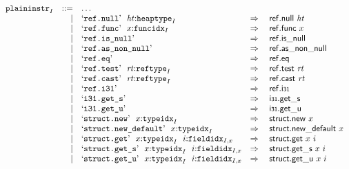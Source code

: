 $$
\begin{array}[t]{@{}lrrl@{}l@{}l@{}l@{}}
& {{\mathtt{plaininstr}}}_{I} & ::= & \dots \\
& & | & \mbox{‘\texttt{ref.null}’}~~{\mathit{ht}}{:}{{\mathtt{heaptype}}}_{I} & \quad\Rightarrow\quad{} & \mathsf{ref{.}null}~{\mathit{ht}} \\
& & | & \mbox{‘\texttt{ref.func}’}~~x{:}{{\mathtt{funcidx}}}_{I} & \quad\Rightarrow\quad{} & \mathsf{ref{.}func}~x \\
& & | & \mbox{‘\texttt{ref.is\_null}’} & \quad\Rightarrow\quad{} & \mathsf{ref{.}is\_null} \\
& & | & \mbox{‘\texttt{ref.as\_non\_null}’} & \quad\Rightarrow\quad{} & \mathsf{ref{.}as\_non\_null} \\
& & | & \mbox{‘\texttt{ref.eq}’} & \quad\Rightarrow\quad{} & \mathsf{ref{.}eq} \\
& & | & \mbox{‘\texttt{ref.test}’}~~{\mathit{rt}}{:}{{\mathtt{reftype}}}_{I} & \quad\Rightarrow\quad{} & \mathsf{ref{.}test}~{\mathit{rt}} \\
& & | & \mbox{‘\texttt{ref.cast}’}~~{\mathit{rt}}{:}{{\mathtt{reftype}}}_{I} & \quad\Rightarrow\quad{} & \mathsf{ref{.}cast}~{\mathit{rt}} \\
& & | & \mbox{‘\texttt{ref.i31}’} & \quad\Rightarrow\quad{} & \mathsf{ref{.}i{\scriptstyle 31}} \\
& & | & \mbox{‘\texttt{i31.get\_s}’} & \quad\Rightarrow\quad{} & {\mathsf{i{\scriptstyle 31}{.}get}}{\mathsf{\_}}{\mathsf{s}} \\
& & | & \mbox{‘\texttt{i31.get\_u}’} & \quad\Rightarrow\quad{} & {\mathsf{i{\scriptstyle 31}{.}get}}{\mathsf{\_}}{\mathsf{u}} \\
& & | & \mbox{‘\texttt{struct.new}’}~~x{:}{{\mathtt{typeidx}}}_{I} & \quad\Rightarrow\quad{} & \mathsf{struct{.}new}~x \\
& & | & \mbox{‘\texttt{struct.new\_default}’}~~x{:}{{\mathtt{typeidx}}}_{I} & \quad\Rightarrow\quad{} & \mathsf{struct{.}new\_default}~x \\
& & | & \mbox{‘\texttt{struct.get}’}~~x{:}{{\mathtt{typeidx}}}_{I}~~i{:}{{\mathtt{fieldidx}}}_{I, x} & \quad\Rightarrow\quad{} & \mathsf{struct{.}get}~x~i \\
& & | & \mbox{‘\texttt{struct.get\_s}’}~~x{:}{{\mathtt{typeidx}}}_{I}~~i{:}{{\mathtt{fieldidx}}}_{I, x} & \quad\Rightarrow\quad{} & {\mathsf{struct{.}get}}{\mathsf{\_}}{\mathsf{s}}~x~i \\
& & | & \mbox{‘\texttt{struct.get\_u}’}~~x{:}{{\mathtt{typeidx}}}_{I}~~i{:}{{\mathtt{fieldidx}}}_{I, x} & \quad\Rightarrow\quad{} & {\mathsf{struct{.}get}}{\mathsf{\_}}{\mathsf{u}}~x~i \\

\end{array}$$
